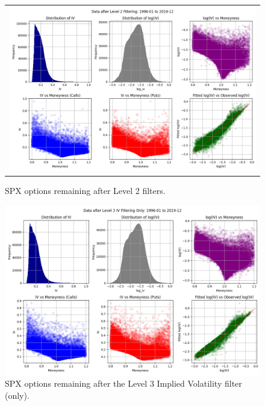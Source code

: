\documentclass{article}
\begin{document}
\begin{appendices}
\begin{figure}[H]
  \centering
  \begin{tabular}{@{}c@{}}
    \includegraphics[width=\linewidth,height=0.666\linewidth]{../docs_src/L2_1996-01_2019-12_iv.png}
  \end{tabular}
  \caption{SPX options remaining after Level 2 filters.}
  \label{fig:l2_spx_options_data}
\end{figure}


\begin{figure}[H]
  \centering
  \includegraphics[width=\linewidth,height=0.666\linewidth]{../docs_src/L3_IV_1996-01_2019-12_iv.png}
  \caption{SPX options remaining after the Level 3 Implied Volatility filter (only).}
  \label{fig:l3_iv_only_spx_options_data}
\end{figure}



\end{appendices}
\end{document}
